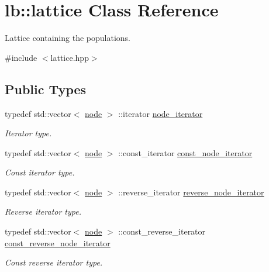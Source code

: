 \hypertarget{classlb_1_1lattice}{\section{lb\-:\-:lattice \-Class \-Reference}
\label{classlb_1_1lattice}
}


\-Lattice containing the populations.  




{\ttfamily \#include $<$lattice.\-hpp$>$}

\subsection*{\-Public \-Types}
\begin{DoxyCompactItemize}
\item 
\hypertarget{classlb_1_1lattice_ac99739da5030b2f0c3d28618d2db83b8}{typedef std\-::vector$<$ \hyperlink{structlb_1_1node}{node} $>$\*
\-::iterator \hyperlink{classlb_1_1lattice_ac99739da5030b2f0c3d28618d2db83b8}{node\-\_\-iterator}}\label{classlb_1_1lattice_ac99739da5030b2f0c3d28618d2db83b8}

\begin{DoxyCompactList}\small\item\em \-Iterator type. \end{DoxyCompactList}\item 
\hypertarget{classlb_1_1lattice_aa19f16e07ac70d4eddb4c3bdca1a314a}{typedef std\-::vector$<$ \hyperlink{structlb_1_1node}{node} $>$\*
\-::const\-\_\-iterator \hyperlink{classlb_1_1lattice_aa19f16e07ac70d4eddb4c3bdca1a314a}{const\-\_\-node\-\_\-iterator}}\label{classlb_1_1lattice_aa19f16e07ac70d4eddb4c3bdca1a314a}

\begin{DoxyCompactList}\small\item\em \-Const iterator type. \end{DoxyCompactList}\item 
\hypertarget{classlb_1_1lattice_a8f14fa67ef5e16926d41569949aaf419}{typedef std\-::vector$<$ \hyperlink{structlb_1_1node}{node} $>$\*
\-::reverse\-\_\-iterator \hyperlink{classlb_1_1lattice_a8f14fa67ef5e16926d41569949aaf419}{reverse\-\_\-node\-\_\-iterator}}\label{classlb_1_1lattice_a8f14fa67ef5e16926d41569949aaf419}

\begin{DoxyCompactList}\small\item\em \-Reverse iterator type. \end{DoxyCompactList}\item 
\hypertarget{classlb_1_1lattice_abe55fc29d14a9a380106ea7a138e1931}{typedef std\-::vector$<$ \hyperlink{structlb_1_1node}{node} $>$\*
\-::const\-\_\-reverse\-\_\-iterator \hyperlink{classlb_1_1lattice_abe55fc29d14a9a380106ea7a138e1931}{const\-\_\-reverse\-\_\-node\-\_\-iterator}}\label{classlb_1_1lattice_abe55fc29d14a9a380106ea7a138e1931}

\begin{DoxyCompactList}\small\item\em \-Const reverse iterator type. \end{DoxyCompactList}\end{DoxyCompactItemize}
